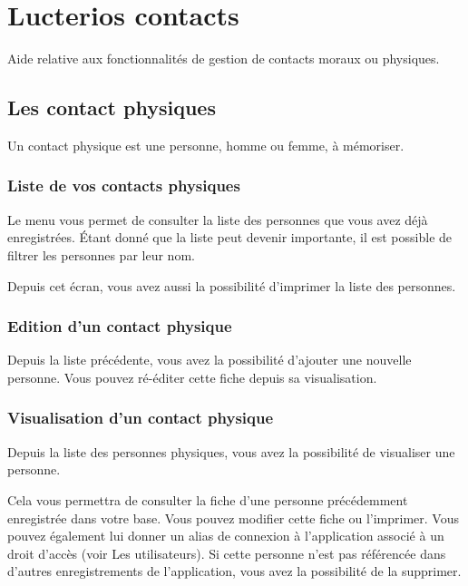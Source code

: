 \documentclass[a4paper,10pt,oneside,french]{sphinxmanual}
\begin{document}
\chapter{Lucterios contacts}
\label{\detokenize{contacts/index:lucterios-contacts}}\label{\detokenize{contacts/index::doc}}
Aide relative aux fonctionnalités de gestion de contacts moraux ou physiques.


\section{Les contact physiques}
\label{\detokenize{contacts/individual:les-contact-physiques}}\label{\detokenize{contacts/individual::doc}}
Un contact physique est une personne, homme ou femme, à mémoriser.


\subsection{Liste de vos contacts physiques}
\label{\detokenize{contacts/individual:liste-de-vos-contacts-physiques}}
Le menu  vous permet de consulter la liste des personnes que vous avez déjà enregistrées. Étant donné que la liste peut devenir importante, il est possible de filtrer les personnes par leur nom.

Depuis cet écran, vous avez aussi la possibilité d’imprimer la liste des personnes.

\noindent{}


\subsection{Edition d’un contact physique}
\label{\detokenize{contacts/individual:edition-d-un-contact-physique}}
Depuis la liste précédente, vous avez la possibilité d’ajouter une nouvelle personne. Vous pouvez ré-éditer cette fiche depuis sa visualisation.

\noindent{}


\subsection{Visualisation d’un contact physique}
\label{\detokenize{contacts/individual:visualisation-d-un-contact-physique}}
Depuis la liste des personnes physiques, vous avez la possibilité de visualiser une personne.

Cela vous permettra de consulter la fiche d’une personne précédemment enregistrée dans votre base. Vous pouvez modifier cette fiche ou l’imprimer. Vous pouvez également lui donner un alias de connexion à l’application associé à un droit d’accès (voir Les utilisateurs). Si cette personne n’est pas référencée dans d’autres enregistrements de l’application, vous avez la possibilité de la supprimer.
\end{document}
